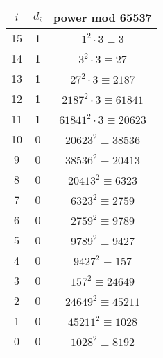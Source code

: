 \begin{center}
\begin{tabular}{c|c|c}
$i$ & $d_i$ & power mod 65537 \\\hline 
15 & 1 & $1^2 \cdot 3 \equiv 3$ \\
14 & 1 & $3^2 \cdot 3 \equiv 27$ \\
13 & 1 & $27^2 \cdot 3 \equiv 2187$ \\
12 & 1 & $2187^2 \cdot 3 \equiv 61841$ \\
11 & 1 & $61841^2 \cdot 3 \equiv 20623$ \\
10 & 0 & $20623^2 \equiv 38536$ \\
9 & 0 & $38536^2 \equiv 20413$ \\
8 & 0 & $20413^2 \equiv 6323$ \\
7 & 0 & $6323^2 \equiv 2759$ \\
6 & 0 & $2759^2 \equiv 9789$ \\
5 & 0 & $9789^2 \equiv 9427$ \\
4 & 0 & $9427^2 \equiv 157$ \\
3 & 0 & $157^2 \equiv 24649$ \\
2 & 0 & $24649^2 \equiv 45211$ \\
1 & 0 & $45211^2 \equiv 1028$ \\
0 & 0 & $1028^2 \equiv 8192$ \\
\end{tabular}
\end{center}
